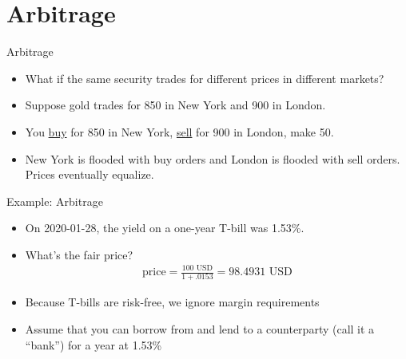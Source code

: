\documentclass{beamer}
\begin{document}

\section{Arbitrage}

\begin{frame}{Arbitrage}
\begin{itemize}
\item What if the same security trades for different prices in different markets?
\item Suppose gold trades for 850 in New York and 900 in London.
\item You \underline{buy} for 850 in New York, \underline{sell} for 900 in London, make 50. 
\item New York is flooded with buy orders and London is flooded with sell orders. Prices eventually equalize.
\end{itemize}
\end{frame}

\begin{frame}{Example: Arbitrage}
\begin{itemize}
\item On 2020-01-28, the yield on a one-year T-bill was 1.53\%. 
\item What's the fair price?
\begin{align*}
	\text{price}=\frac{100\text{ USD}}{1+.0153}=98.4931\text{ USD}
\end{align*}
\item Because T-bills are risk-free, we ignore margin requirements
\item Assume that you can borrow from and lend to a counterparty (call it a ``bank'') for a year at 1.53\%
\end{itemize}
\end{frame}
\end{document}
